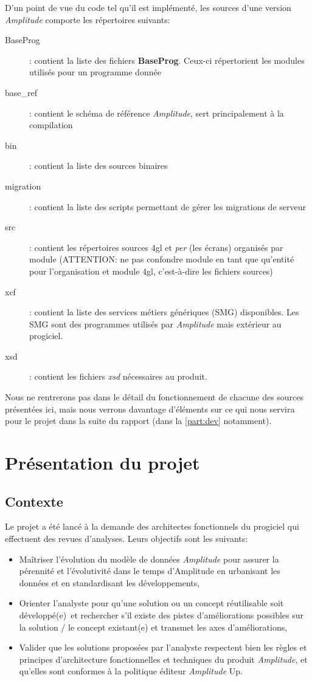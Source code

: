 \documentclass{polytech/polytech}
\begin{document}
D'un point de vue du code tel qu'il est implémenté, les sources d'une version \textit{Amplitude} comporte les répertoires suivants:

\begin{description}
	\item[BaseProg] : contient la liste des fichiers \textbf{BaseProg}. Ceux-ci répertorient les modules utilisés pour un programme donnée
	\item[base\_ref] : contient le schéma de référence \textit{Amplitude}, sert principalement à la compilation
	\item[bin] : contient la liste des sources binaires
	\item[migration] : contient la liste des scripts permettant de gérer les migrations de serveur
	\item[src] : contient les répertoires sources 4gl et \textit{per} (les écrans) organisés par module (ATTENTION: ne pas confondre module en tant que qu'entité pour l'organisation et module 4gl, c'est-à-dire les fichiers sources)
	\item[xcf] : contient la liste des services métiers génériques (SMG) disponibles. Les SMG sont des programmes utilisés par \textit{Amplitude} mais extérieur au progiciel.
	\item[xsd] : contient les fichiers \textit{xsd} nécessaires au produit.
\end{description}

Nous ne rentrerons pas dans le détail du fonctionnement de chacune des sources présentées ici, mais nous verrons davantage d'éléments sur ce qui nous servira pour le projet dans la suite du rapport (dans la \autoref{part:dev} notamment).


\chapter{Présentation du projet}

\section{Contexte}

Le projet a été lancé à la demande des architectes fonctionnels du progiciel qui effectuent des revues d'analyses. Leurs objectifs sont les suivants:

\begin{itemize}
	\item Maîtriser l’évolution du modèle de données \textit{Amplitude} pour assurer la pérennité et l’évolutivité dans le temps d’Amplitude en urbanisant les données et en standardisant les développements,
	\item Orienter l’analyste pour qu’une solution ou un concept réutilisable soit développé(e) et rechercher s’il existe des pistes d’améliorations possibles sur la solution / le concept existant(e) et transmet les axes d’améliorations,
	\item Valider que les solutions proposées par l’analyste respectent bien les règles et principes d’architecture fonctionnelles et techniques du produit \textit{Amplitude}, et qu’elles sont conformes à la politique éditeur \textit{Amplitude} Up.
\end{itemize}
\end{document}
